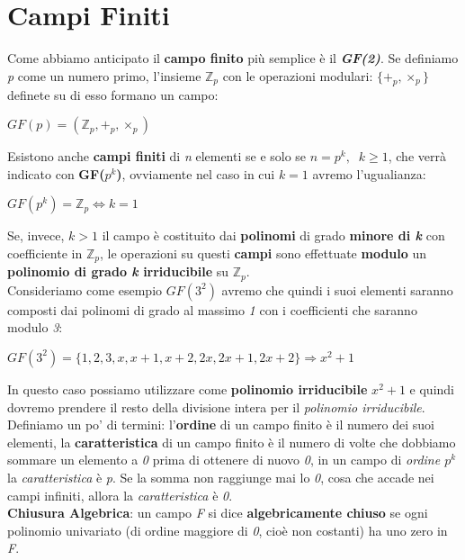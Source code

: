 \section{Campi Finiti}
Come abbiamo anticipato il \textbf{campo finito} più semplice è il \textbf{\textit{GF(2)}}. Se definiamo \textit{p} come un numero primo, l'insieme $\mathbb{Z}_p$ con le operazioni modulari: $\{+_p, \times_p\}$ definete su di esso formano un campo:
\begin{center}
    $GF(p) = (\mathbb{Z}_p, +_p, \times_p)$
\end{center}
Esistono anche \textbf{campi finiti} di \textit{n} elementi se e solo se $n = p^k, \;\; k \geq 1$, che verrà indicato con \textbf{GF($p^k$)}, ovviamente nel caso in cui $k = 1$ avremo l'ugualianza:
\begin{center} 
    $GF(p^k) = \mathbb{Z}_p \iff k = 1$
\end{center}
Se, invece, $k > 1$ il campo è costituito dai \textbf{polinomi} di grado \textbf{minore di \textit{k}} con coefficiente in $\mathbb{Z}_p$, le operazioni su questi \textbf{campi} sono effettuate \textbf{modulo} un \textbf{polinomio di grado \textit{k} irriducibile} su $\mathbb{Z}_p$. \\
Consideriamo come esempio $GF(3^2)$ avremo che quindi i suoi elementi saranno composti dai polinomi di grado al massimo \textit{1} con i coefficienti che saranno modulo \textit{3}:
\begin{center}
    $GF(3^2) = \{1, 2, 3, x, x + 1, x + 2, 2x, 2x + 1, 2x + 2\} \Rightarrow x^2 + 1$ 
\end{center}
In questo caso possiamo utilizzare come \textbf{polinomio irriducibile} $x^2 + 1$ e quindi dovremo prendere il resto della divisione intera per il \textit{polinomio irriducibile}. \\
Definiamo un po' di termini: l'\textbf{ordine} di un campo finito è il numero dei suoi elementi, la \textbf{caratteristica} di un campo finito è il numero di volte che dobbiamo sommare un elemento a \textit{0} prima di ottenere di nuovo \textit{0}, in un campo di \textit{ordine $p^k$} la \textit{caratteristica} è \textit{p}. Se la somma non raggiunge mai lo \textit{0}, cosa che accade nei campi infiniti, allora la \textit{caratteristica} è \textit{0}. \\
\textbf{Chiusura Algebrica}: un campo \textit{F} si dice \textbf{algebricamente chiuso} se ogni polinomio univariato (di ordine maggiore di \textit{0}, cioè non costanti) ha uno zero in \textit{F}.

\newpage
